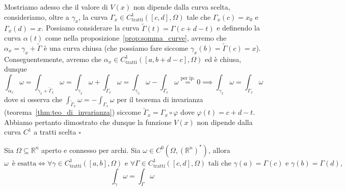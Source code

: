 Mostriamo adesso che il valore di $V(x)$ non dipende dalla curva scelta, consideriamo, oltre a $\gamma_x$, la curva $\Gamma_x \in C^1_\text{tratti}([c, d], \Omega)$ tale che $\Gamma_x(c) = x_0$ e $\Gamma_x(d) = x$. Possiamo considerare la curva $\tilde{\Gamma}(t) = \Gamma(c + d - t)$ e definendo la curva $\alpha(t)$ come nella proposizione~\ref{prop:somma_curve}, avremo che $\alpha_x = \gamma_x + \tilde{\Gamma}$ è una curva chiusa (che possiamo fare
siccome $\gamma_x(b) = \tilde{\Gamma}(c) = x$). \\
Conseguentemente, avremo che $\alpha_x \in C^1_\text{tratti}([a, b+d-c], \Omega)$ ed è chiusa, dunque
$$
\int_{\alpha_x} \omega = \int_{\gamma_x + \tilde{\Gamma}_x} \omega = \int_{\gamma_x} \omega + \int_{\tilde{\Gamma}_x} \omega = \int_{\gamma_x} \omega - \int_{\Gamma_x} \omega \stackrel{\text{per ip.}}{=} 0 \implies \int_{\gamma_x} \omega= \int_{\Gamma_x} \omega
$$
dove si osserva che $\int_{\tilde{\Gamma}_x} \omega = - \int_{\Gamma_x} \omega$ per il teorema di invarianza (teorema~\ref{thm:teo_di_invarianza}) siccome $\tilde{\Gamma}_x = \Gamma_x \circ \varphi$ dove $\varphi(t) = c + d - t$. Abbiamo pertanto dimostrato che dunque la funzione $V(x)$ non dipende dalla curva $C^1$ a tratti scelta
\hfill $\square$

\vspace{0.5cm}
\begin{theorem}[\textcolor{blue}{CF2}]
	Sia $\Omega \subseteq \mathbb{R}^n$ aperto e connesso per archi. Sia $\omega \in C^0(\Omega, (\mathbb{R}^n)^*)$, allora $\omega \, \text{ è esatta} \iff \forall \gamma \in C^1_\text{tratti}([a,b], \Omega) \text{ e } \forall \Gamma \in C^1_\text{tratti}([c,d], \Omega) \text{ tali che } \gamma(a) = \Gamma(c) \text{ e } \gamma(b) = \Gamma(d), $
	$$ 
	\int_\gamma \omega = \int_\Gamma \omega
	$$
\end{theorem}

